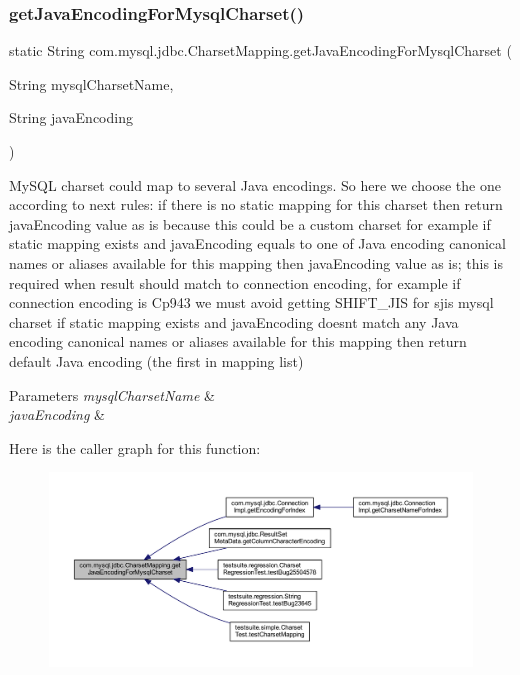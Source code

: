 \subsubsection{\texorpdfstring{get\+Java\+Encoding\+For\+Mysql\+Charset()}{getJavaEncodingForMysqlCharset()}}
{\footnotesize\ttfamily static String com.\+mysql.\+jdbc.\+Charset\+Mapping.\+get\+Java\+Encoding\+For\+Mysql\+Charset (\begin{DoxyParamCaption}\item[{String}]{mysql\+Charset\+Name,  }\item[{String}]{java\+Encoding }\end{DoxyParamCaption})\hspace{0.3cm}{\ttfamily [static]}}

My\+S\+QL charset could map to several Java encodings. So here we choose the one according to next rules\+: if there is no static mapping for this charset then return java\+Encoding value as is because this could be a custom charset for example if static mapping exists and java\+Encoding equals to one of Java encoding canonical names or aliases available for this mapping then java\+Encoding value as is; this is required when result should match to connection encoding, for example if connection encoding is Cp943 we must avoid getting S\+H\+I\+F\+T\+\_\+\+J\+IS for sjis mysql charset if static mapping exists and java\+Encoding doesn\textquotesingle{}t match any Java encoding canonical names or aliases available for this mapping then return default Java encoding (the first in mapping list)


\begin{DoxyParams}{Parameters}
{\em mysql\+Charset\+Name} & \\
\hline
{\em java\+Encoding} & \\
\hline
\end{DoxyParams}
Here is the caller graph for this function\+:\nopagebreak
\begin{figure}[H]
\begin{center}
\leavevmode
\includegraphics[width=350pt]{classcom_1_1mysql_1_1jdbc_1_1_charset_mapping_a1ed354f292dc235b766f7c5fa8b7cff0_icgraph}
\end{center}
\end{figure}
\mbox{\label{classcom_1_1mysql_1_1jdbc_1_1_charset_mapping_a975ea312dfd719facd25053d58848d76}} 

